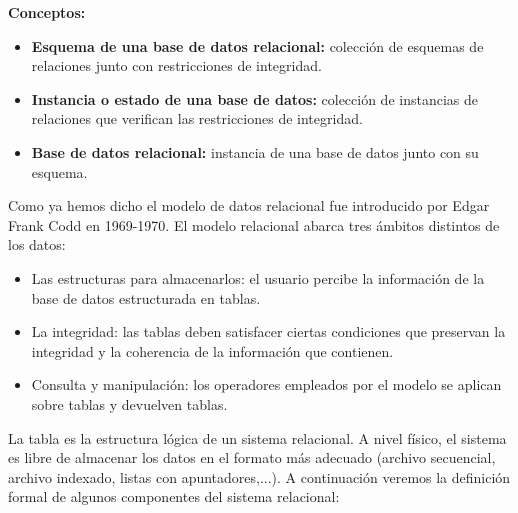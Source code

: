 \documentclass[a4paper,11pt]{article}
\begin{document}
\textbf{Conceptos:}
\begin{itemize}
\item \textbf{Esquema de una base de datos relacional:} colección de esquemas de relaciones junto con restricciones de integridad.

\item \textbf{Instancia o estado de una base de datos:} colección de instancias de relaciones que verifican las restricciones de integridad.

\item \textbf{Base de datos relacional:} instancia de una base de datos junto con su esquema.
\end{itemize}

Como ya hemos dicho el modelo de datos relacional fue introducido por Edgar Frank Codd en 1969-1970. El modelo relacional abarca tres ámbitos distintos de los datos:

\begin{itemize}
\item Las estructuras para almacenarlos: el usuario percibe la información de la base de datos estructurada en tablas.

\item La integridad: las tablas deben satisfacer ciertas condiciones que preservan la integridad y la coherencia de la información que contienen.

\item Consulta y manipulación: los operadores empleados por el modelo se aplican sobre tablas y devuelven tablas.
\end{itemize}

La tabla es la estructura lógica de un sistema relacional. A nivel físico, el sistema es libre de almacenar los datos en el formato más adecuado (archivo secuencial, archivo indexado, listas con apuntadores,...). A continuación veremos la definición formal de algunos componentes del sistema relacional:
\end{document}

